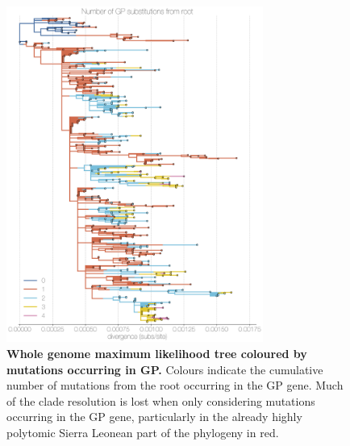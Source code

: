 \documentclass[11pt,oneside,letterpaper]{article}
\begin{document}



\newpage

\setcounter{figure}{0}
\setcounter{table}{0}
\renewcommand{\thefigure}{S\arabic{figure}}
\renewcommand{\thetable}{S\arabic{table}}


\begin{figure}[h]
 \centering
	\includegraphics[width=0.75\textwidth]{supp_figures/sfigX_embedding.png}
	\caption{\textbf{Whole genome maximum likelihood tree coloured by mutations occurring in GP.}
  Colours indicate the cumulative number of mutations from the root occurring in the GP gene.
  Much of the clade resolution is lost when only considering mutations occurring in the GP gene, particularly in the already highly polytomic Sierra Leonean part of the phylogeny in red.
	}
	\label{embedding}
\end{figure}
\end{document}
